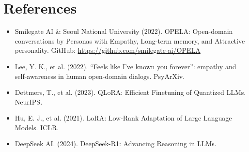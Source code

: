 \documentclass[11pt, a4paper]{article}
\begin{document}
\section{References}

\begin{itemize}
    \item Smilegate AI \& Seoul National University (2022). OPELA: Open-domain conversations by Personas with Empathy, Long-term memory, and Attractive personality. GitHub: \url{https://github.com/smilegate-ai/OPELA}
    \item Lee, Y. K., et al. (2022). ``Feels like I've known you forever'': empathy and self-awareness in human open-domain dialogs. PsyArXiv.
    \item Dettmers, T., et al. (2023). QLoRA: Efficient Finetuning of Quantized LLMs. NeurIPS.
    \item Hu, E. J., et al. (2021). LoRA: Low-Rank Adaptation of Large Language Models. ICLR.
    \item DeepSeek AI. (2024). DeepSeek-R1: Advancing Reasoning in LLMs.
\end{itemize}
\end{document}
